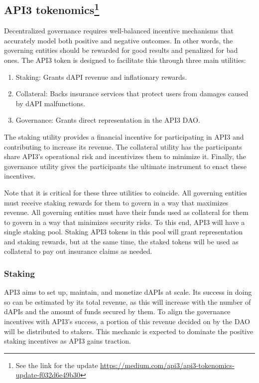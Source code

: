 \documentclass[11pt]{article}
\begin{document}
\subsection[API3 tokenomics]{API3 tokenomics\footnote{See the link for the update \url{https://medium.com/api3/api3-tokenomics-update-f032d6e49b30}}}
\label{sec:api3-tokenomics}

Decentralized governance requires well-balanced incentive mechanisms that accurately model both positive and negative outcomes.
In other words, the governing entities should be rewarded for good results and penalized for bad ones.
The API3 token is designed to facilitate this through three main utilities:

\begin{enumerate}
    \item Staking: Grants dAPI revenue and inflationary rewards.
    \item Collateral: Backs insurance services that protect users from damages caused by dAPI malfunctions.
    \item Governance: Grants direct representation in the API3 DAO.
\end{enumerate}

The staking utility provides a financial incentive for participating in API3 and contributing to increase its revenue.
The collateral utility has the participants share API3’s operational risk and incentivizes them to minimize it.
Finally, the governance utility gives the participants the ultimate instrument to enact these incentives.

Note that it is critical for these three utilities to coincide.
All governing entities must receive staking rewards for them to govern in a way that maximizes revenue.
All governing entities must have their funds used as collateral for them to govern in a way that minimizes security risks.
To this end, API3 will have a single staking pool.
Staking API3 tokens in this pool will grant representation and staking rewards, but at the same time, the staked tokens will be used as collateral to pay out insurance claims as needed.

\subsubsection{Staking}
\label{sec:staking}

API3 aims to set up, maintain, and monetize dAPIs at scale.
Its success in doing so can be estimated by its total revenue, as this will increase with the number of dAPIs and the amount of funds secured by them.
To align the governance incentives with API3’s success, a portion of this revenue decided on by the DAO will be distributed to stakers.
This mechanic is expected to dominate the positive staking incentives as API3 gains traction.
\end{document}
